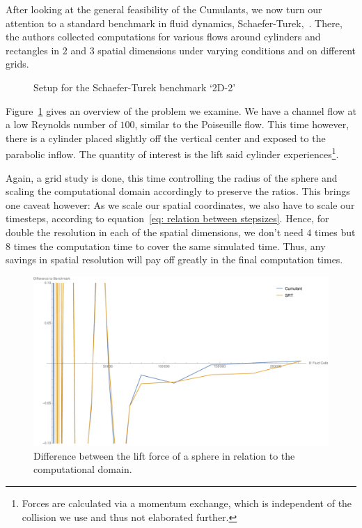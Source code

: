 After looking at the general feasibility of the Cumulants, we now turn our attention to a standard benchmark in fluid dynamics, Schaefer-Turek,~\cite{schafer1996benchmark}.
There, the authors collected computations for various flows around cylinders and rectangles in $2$ and $3$ spatial dimensions under varying conditions and on different grids.

\begin{figure}
  \centering
  
  \caption{Setup for the Schaefer-Turek benchmark `2D-2'}
\label{fig: schaeferTurek}
\end{figure}

Figure~\ref{fig: schaeferTurek} gives an overview of the problem we examine.
We have a channel flow at a low Reynolds number of $100$, similar to the Poiseuille flow.
This time however, there is a cylinder placed slightly off the vertical center and exposed to the parabolic inflow.
The quantity of interest is the lift said cylinder experiences\footnote{Forces are calculated via a momentum exchange, which is independent of the collision we use and thus not elaborated further.}.

Again, a grid study is done, this time controlling the radius of the sphere and scaling the computational domain accordingly to preserve the ratios.
This brings one caveat however:
As we scale our spatial coordinates, we also have to scale our timesteps, according to equation~\eqref{eq: relation between stepsizes}.
Hence, for double the resolution in each of the spatial dimensions, we don't need $4$ times but $8$ times the computation time to cover the same simulated time.
Thus, any savings in spatial resolution will pay off greatly in the final computation times.


\begin{figure}
  \centering
  \includegraphics[width=\linewidth]{../figures/schaeferTurekLift_nrFluidVsDiff.pdf} %
  \caption{Difference between the lift force of a sphere in relation to the computational domain.}
\label{fig: schaefer turek nrFluidVsDiff}
\end{figure}

